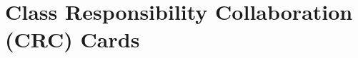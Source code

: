 \section{Class Responsibility Collaboration (CRC) Cards}
\label{sec:crc_cards}

% 












\newpage






